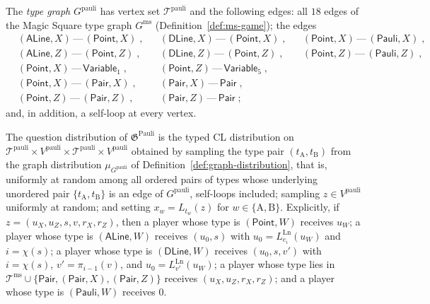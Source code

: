 \begin{definition}
	The \emph{type graph} $G^{\mathrm{pauli}}$ has vertex set $\mathcal T^{\mathrm{pauli}}$ and the following edges: all $18$ edges of the Magic Square type graph $G^{\mathrm{ms}}$ (Definition~\ref{def:ms-game}); the edges
	\begin{align*}
		&(\mathsf{ALine},X) \,\text{---}\, (\mathsf{Point},X)\;, &&(\mathsf{DLine},X) \,\text{---}\, (\mathsf{Point},X)\;, &&(\mathsf{Point},X) \,\text{---}\, (\mathsf{Pauli},X)\;,\\
		&(\mathsf{ALine},Z) \,\text{---}\, (\mathsf{Point},Z)\;, &&(\mathsf{DLine},Z) \,\text{---}\, (\mathsf{Point},Z)\;, &&(\mathsf{Point},Z) \,\text{---}\, (\mathsf{Pauli},Z)\;,\\
		&(\mathsf{Point},X) \,\text{---}\, \mathsf{Variable}_1\;, &&(\mathsf{Point},Z) \,\text{---}\, \mathsf{Variable}_5\;, &&\\
		&(\mathsf{Point},X) \,\text{---}\, (\mathsf{Pair},X)\;, &&(\mathsf{Pair},X) \,\text{---}\, \mathsf{Pair}\;, &&\\
		&(\mathsf{Point},Z) \,\text{---}\, (\mathsf{Pair},Z)\;, &&(\mathsf{Pair},Z) \,\text{---}\, \mathsf{Pair}\;; &&
	\end{align*}
	and, in addition, a self-loop at every vertex.

	The question distribution of $\mathfrak{G}^{\mathrm{Pauli}}$ is the typed CL distribution on $\mathcal T^{\mathrm{pauli}} \times V^{\mathrm{pauli}} \times \mathcal T^{\mathrm{pauli}} \times V^{\mathrm{pauli}}$ obtained by sampling the type pair $(t_{\mathrm A}, t_{\mathrm B})$ from the graph distribution $\mu_{G^{\mathrm{pauli}}}$ of Definition~\ref{def:graph-distribution}, that is, uniformly at random among all ordered pairs of types whose underlying unordered pair $\{t_{\mathrm A}, t_{\mathrm B}\}$ is an edge of $G^{\mathrm{pauli}}$, self-loops included; sampling $z \in V^{\mathrm{pauli}}$ uniformly at random; and setting $x_w = L_{t_w}(z)$ for $w \in \{\mathrm A,\mathrm B\}$. Explicitly, if $z = (u_X,u_Z,s,v,r_X,r_Z)$, then a player whose type is $(\mathsf{Point},W)$ receives $u_W$; a player whose type is $(\mathsf{ALine},W)$ receives $(u_0, s)$ with $u_0 = L^{\mathrm{Ln}}_{e_i}(u_W)$ and $i = \chi(s)$; a player whose type is $(\mathsf{DLine},W)$ receives $(u_0, s, v')$ with $i = \chi(s)$, $v' = \pi_{i-1}(v)$, and $u_0 = L^{\mathrm{Ln}}_{v'}(u_W)$; a player whose type lies in $\mathcal T^{\mathrm{ms}} \cup \{\mathsf{Pair}, (\mathsf{Pair},X), (\mathsf{Pair},Z)\}$ receives $(u_X, u_Z, r_X, r_Z)$; and a player whose type is $(\mathsf{Pauli},W)$ receives $0$.
\end{definition}

